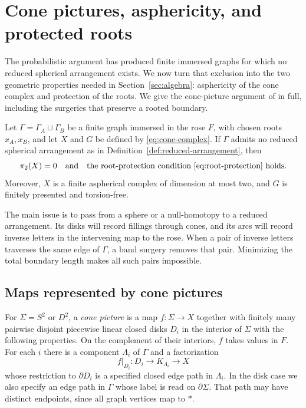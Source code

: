 \section{Cone pictures, asphericity, and protected roots}\label{sec:topology}

The probabilistic argument has produced finite immersed graphs for which
no reduced spherical arrangement exists.  We now turn that exclusion
into the two geometric properties needed in Section~\ref{sec:algebra}:
asphericity of the cone complex and protection of the roots.  We give
the cone-picture argument of
\cite[Proposition~5.1 and Corollary~5.3]{OpenAI2026ZD} in full,
including the surgeries that
preserve a rooted boundary.

\begin{proposition}\label{prop:cone-criterion}
Let $\Gamma=\Gamma_A\sqcup\Gamma_B$ be a finite graph immersed in the
rose $F$, with chosen roots $x_A,x_B$, and let $X$ and $G$ be defined
by \eqref{eq:cone-complex}.  If $\Gamma$ admits no reduced spherical
arrangement as in Definition~\ref{def:reduced-arrangement}, then
\[
 \pi_2(X)=0
 \quad\text{and}\quad
 \text{the root-protection condition \eqref{eq:root-protection} holds}.
\]
Moreover, $X$ is a finite aspherical complex of dimension at most two,
and $G$ is finitely presented and torsion-free.
\end{proposition}

The main issue is to pass from a sphere or a null-homotopy to a reduced
arrangement.  Its disks will record fillings through cones, and its arcs
will record inverse letters in the intervening map to the rose.  When a
pair of inverse letters traverses the same edge of $\Gamma$, a band
surgery removes that pair.  Minimizing the total boundary length makes
all such pairs impossible.

\subsection{Maps represented by cone pictures}

For $\Sigma=S^2$ or $D^2$, a \emph{cone picture} is a map
$f\colon\Sigma\to X$ together with finitely many pairwise disjoint
piecewise linear closed disks $D_i$ in the interior of $\Sigma$ with
the following properties.  On the complement of their interiors, $f$
takes values in $F$.  For each $i$ there is a component $\Lambda_i$ of
$\Gamma$ and a factorization
\[
 f|_{D_i}\colon D_i\longrightarrow K_{\Lambda_i}\longrightarrow X
\]
whose restriction to $\partial D_i$ is a specified closed edge path
in $\Lambda_i$.  In the disk case we also specify an edge path in
$\Gamma$ whose label is read on $\partial\Sigma$.  That path may have
distinct endpoints, since all graph vertices map to $*$.

